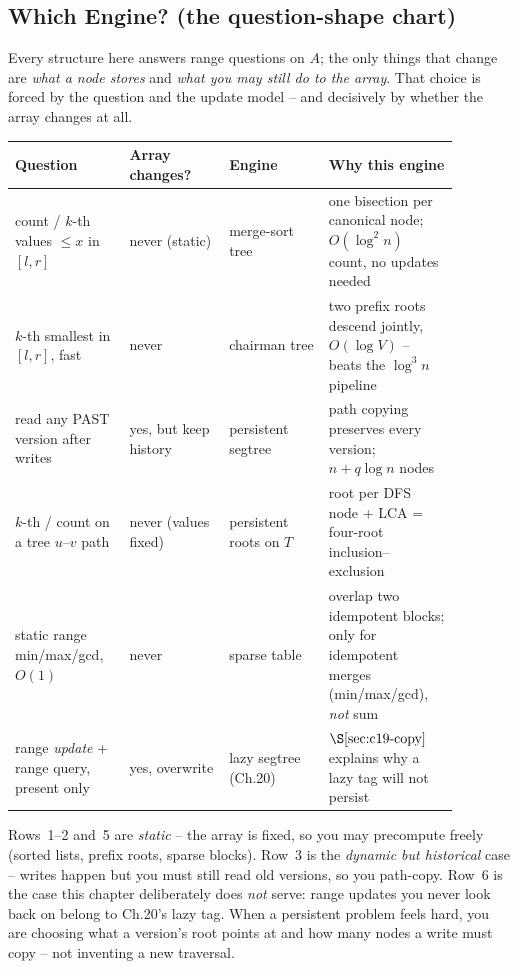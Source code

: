 \subsection*{Which Engine? (the question-shape chart)}

Every structure here answers range questions on \(A\); the only things that
change are \emph{what a node stores} and \emph{what you may still do to the
array}.  That choice is forced by the question and the update model -- and
decisively by whether the array changes at all.

\begin{center}
\small
\renewcommand{\arraystretch}{1.25}
\begin{tabular}{@{}p{0.22\linewidth} p{0.20\linewidth} p{0.20\linewidth} p{0.26\linewidth}@{}}
\toprule
\textbf{Question} & \textbf{Array changes?} & \textbf{Engine} & \textbf{Why this engine} \\
\midrule
count / \(k\)-th values \(\le x\) in \([l,r]\) & never (static) & merge-sort tree & one bisection per canonical node; \(O(\log^2 n)\) count, no updates needed \\
\(k\)-th smallest in \([l,r]\), fast & never & chairman tree & two prefix roots descend jointly, \(O(\log V)\) -- beats the \(\log^3 n\) pipeline \\
read any PAST version after writes & yes, but keep history & persistent segtree & path copying preserves every version; \(n+q\log n\) nodes \\
\(k\)-th / count on a tree \(u\)--\(v\) path & never (values fixed) & persistent roots on \(T\) & root per DFS node + LCA = four-root inclusion--exclusion \\
static range min/max/gcd, \(O(1)\) & never & sparse table & overlap two idempotent blocks; only for idempotent merges (min/max/gcd), \emph{not} sum \\
range \emph{update} + range query, present only & yes, overwrite & lazy segtree (Ch.20) & \(\secref{c19-copy}\) explains why a lazy tag will not persist \\
\bottomrule
\end{tabular}
\end{center}

\begin{insightbox}
Rows~1--2 and~5 are \emph{static} -- the array is fixed, so you may precompute
freely (sorted lists, prefix roots, sparse blocks).  Row~3 is the \emph{dynamic
but historical} case -- writes happen but you must still read old versions, so
you path-copy.  Row~6 is the case this chapter deliberately does \emph{not}
serve: range updates you never look back on belong to Ch.20's lazy tag.  When a
persistent problem feels hard, you are choosing what a version's root points at
and how many nodes a write must copy -- not inventing a new traversal.
\end{insightbox}

